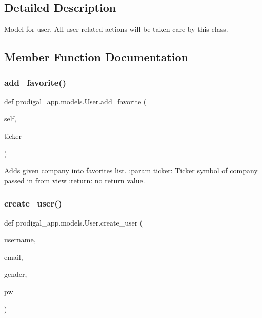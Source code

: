 \subsection{Detailed Description}
\begin{DoxyVerb}Model for user. All user related actions will be taken care by this class.
\end{DoxyVerb}
 

\subsection{Member Function Documentation}
\mbox{\label{classprodigal__app_1_1models_1_1_user_a4b0cfd019e0e5022636cd5c41bc7a024}} 
\subsubsection{\texorpdfstring{add\+\_\+favorite()}{add\_favorite()}}
{\footnotesize\ttfamily def prodigal\+\_\+app.\+models.\+User.\+add\+\_\+favorite (\begin{DoxyParamCaption}\item[{}]{self,  }\item[{}]{ticker }\end{DoxyParamCaption})}

\begin{DoxyVerb}Adds given company into favorites list.
:param ticker: Ticker symbol of company passed in from view
:return: no return value.
\end{DoxyVerb}
 \mbox{\label{classprodigal__app_1_1models_1_1_user_ae3403ac05c2b1c1b79054ce6e4596927}} 
\subsubsection{\texorpdfstring{create\+\_\+user()}{create\_user()}}
{\footnotesize\ttfamily def prodigal\+\_\+app.\+models.\+User.\+create\+\_\+user (\begin{DoxyParamCaption}\item[{}]{username,  }\item[{}]{email,  }\item[{}]{gender,  }\item[{}]{pw }\end{DoxyParamCaption})\hspace{0.3cm}{\ttfamily [static]}}

